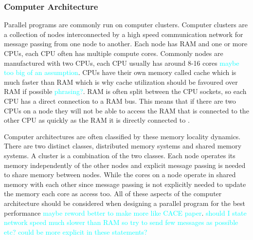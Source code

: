 \documentclass[preprint,11pt,authoryear]{elsarticle}
\begin{document}
	\subsubsection{Computer Architecture}
    \par Parallel programs are commonly run on computer clusters. Computer clusters are a collection of nodes interconnected by a high speed communication network for message passing from one node to another. Each node has RAM and one or more CPUs, each CPU often has multiple compute cores. Commonly nodes are manufactured with two CPUs, each CPU usually has around 8-16 cores \textcolor{cyan}{maybe too big of an assumption}. CPUs have their own memory called cache which is much faster than RAM which is why cache utilization should be favoured over RAM if possible \textcolor{cyan}{phrasing?}. RAM is often split between the CPU sockets, so each CPU has a direct connection to a RAM bus. This means that if there are two CPUs on a node they will not be able to access the RAM that is connected to the other CPU as quickly as the RAM it is directly connected to \cite{Jin2011}. 
    \par Computer architectures are often classified by these memory locality dynamics. There are two distinct classes, distributed memory systems and shared memory systems. A cluster is a combination of the two classes. Each node operates its memory independently of the other nodes and explicit message passing is needed to share memory between nodes. While the cores on a node operate in shared memory with each other since message passing is not explicitly needed to update the memory each core as access too. All of these aspects of the computer architecture should be considered when designing a parallel program for the best performance \cite{Adhianto2007} \textcolor{cyan}{maybe reword better to make more like CACE paper}. \textcolor{cyan}{should I state network speed much slower than RAM so try to send few messages as possible etc? could be more explicit in these statements?}
	
\end{document}
